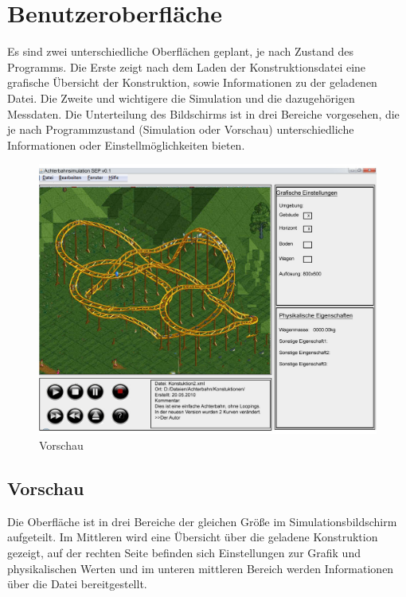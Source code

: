 
\chapter{Benutzeroberfläche}
Es sind zwei unterschiedliche Oberflächen geplant, je nach Zustand des Programms. Die Erste zeigt nach dem Laden der Konstruktionsdatei eine grafische Übersicht der Konstruktion, sowie Informationen zu der geladenen Datei. Die Zweite und wichtigere die Simulation und die dazugehörigen Messdaten. Die Unterteilung des Bildschirms ist in drei Bereiche vorgesehen, die je nach Programmzustand (Simulation oder Vorschau) unterschiedliche Informationen oder Einstellmöglichkeiten bieten.




\begin{figure}[!h]%
\includegraphics[width=0.8\linewidth]{./bilder/GUI_v3.jpg}%
\caption{Vorschau}%
\label{Vorschau}%
\end{figure}

\section*{Vorschau}
Die Oberfläche ist in drei Bereiche der gleichen Größe im Simulationsbildschirm aufgeteilt. Im Mittleren wird eine Übersicht über die geladene Konstruktion gezeigt, auf der rechten Seite befinden sich Einstellungen zur Grafik und physikalischen Werten und im unteren mittleren Bereich werden Informationen über die Datei bereitgestellt.


